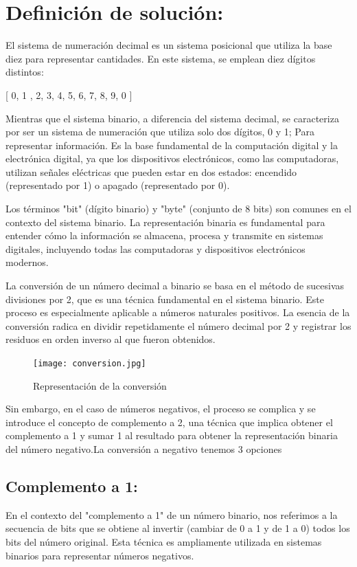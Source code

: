 \documentclass{IEEEcsmag}
\begin{document}
\section*{Definición de solución:}

El sistema de numeración decimal es un sistema posicional que utiliza la base diez para representar cantidades. En este sistema, se emplean diez dígitos distintos:
\newline

[ 0, 1 , 2, 3, 4, 5, 6, 7, 8, 9, 0 ] 
\newline


Mientras que el sistema binario, a diferencia del sistema decimal, se caracteriza por ser un sistema de numeración que utiliza solo dos dígitos, 0 y 1; Para representar información. Es la base fundamental de la computación digital y la electrónica digital, ya que los dispositivos electrónicos, como las computadoras, utilizan señales eléctricas que pueden estar en dos estados: encendido (representado por 1) o apagado (representado por 0).
\newline

Los términos "bit" (dígito binario) y "byte" (conjunto de 8 bits) son comunes en el contexto del sistema binario. La representación binaria es fundamental para entender cómo la información se almacena, procesa y transmite en sistemas digitales, incluyendo todas las computadoras y dispositivos electrónicos modernos.
\newline 

La conversión de un número decimal a binario se basa en el método de sucesivas divisiones por 2, que es una técnica fundamental en el sistema binario. Este proceso es especialmente aplicable a números naturales positivos. La esencia de la conversión radica en dividir repetidamente el número decimal por 2 y registrar los residuos en orden inverso al que fueron obtenidos.

\begin{figure} 
    \centering
    \texttt{[image: conversion.jpg]}
    \caption{Representación de la conversión}
    \label{fig: Conversion a Binario}
\end{figure}

Sin embargo, en el caso de números negativos, el proceso se complica y se introduce el concepto de complemento a 2, una técnica que implica obtener el complemento a 1 y sumar 1 al resultado para obtener la representación binaria del número negativo.La conversión a negativo tenemos 3 opciones 

\subsection{Complemento a 1:}
En el contexto del "complemento a 1" de un número binario, nos referimos a la secuencia de bits que se obtiene al invertir (cambiar de 0 a 1 y de 1 a 0) todos los bits del número original. Esta técnica es ampliamente utilizada en sistemas binarios para representar números negativos.
\newline
\end{document}
